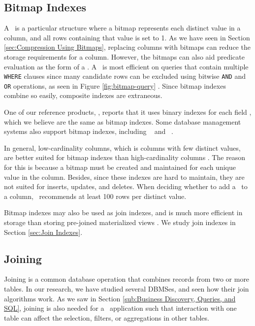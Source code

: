 \subsection{Bitmap Indexes}
\label{sub:Bitmap Indexes}


A \biti~is a particular structure where a bitmap represents each distinct value in a column, and all rows containing that value is set to 1. As we have seen in Section \ref{sec:Compression Using Bitmaps}, replacing columns with bitmaps can reduce the storage requirements for a column. However, the bitmaps can also aid predicate evaluation as the form of a \biti. A \biti~is most efficient on queries that contain multiple \texttt{WHERE} clauses since many candidate rows can be excluded using bitwise \texttt{AND} and \texttt{OR} operations, as seen in Figure \ref{fig:bitmap-query} \cite{noauthor_undated-hp}. Since bitmap indexes combine so easily, composite indexes are extraneous. 

One of our reference products, \qlikview, reports that it uses binary indexes for each field \cite{Qlik2011-ef}, which we believe are the same as bitmap indexes. Some database management systems also support bitmap indexes, including \oracle~\cite{noauthor_undated-hp} and \ibm~\cite{Raman2013-em}.

In general, low-cardinality columns, which is columns with few distinct values, are better suited for bitmap indexes than high-cardinality columns \cite{noauthor_undated-hp}. The reason for this is because a bitmap must be created and maintained for each unique value in the column. Besides, since these indexes are hard to maintain, they are not suited for inserts, updates, and deletes. When deciding whether to add a \biti~to a column, \oracle~recommends at least 100 rows per distinct value. 

Bitmap indexes may also be used as join indexes, and is much more efficient in storage than storing pre-joined materialized views \cite{noauthor_undated-hp}. We study join indexes in Section \ref{sec:Join Indexes}.

\subsection{Joining}
\label{sub:Joining}
Joining is a common database operation that combines records from two or more tables. In our research, we have studied several DBMSes, and seen how their join algorithms work. As we saw in Section \ref{sub:Business Discovery, Queries, and SQL}, joining is also needed for a \bd~application such that interaction with one table can affect the selection, filters, or aggregations in other tables.

